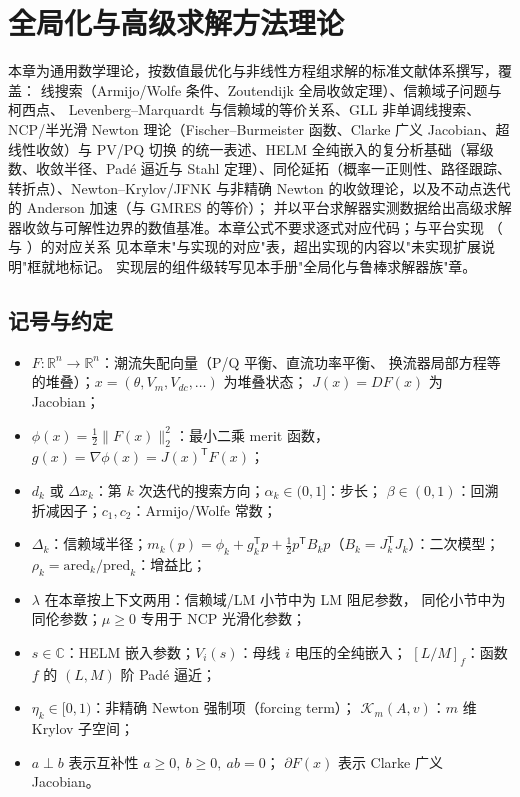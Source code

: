 
\section{全局化与高级求解方法理论}\label{sec:pf-th-glob}

\begin{theorynote}
本章为通用数学理论，按数值最优化与非线性方程组求解的标准文献体系撰写，覆盖：
线搜索（Armijo/Wolfe 条件、Zoutendijk 全局收敛定理）、信赖域子问题与柯西点、
Levenberg--Marquardt 与信赖域的等价关系、GLL 非单调线搜索、NCP/半光滑 Newton
理论（Fischer--Burmeister 函数、Clarke 广义 Jacobian、超线性收敛）与 PV/PQ 切换
的统一表述、HELM 全纯嵌入的复分析基础（幂级数、收敛半径、Padé 逼近与 Stahl
定理）、同伦延拓（概率一正则性、路径跟踪、转折点）、Newton--Krylov/JFNK
与非精确 Newton 的收敛理论，以及不动点迭代的 Anderson 加速（与 GMRES 的等价）；
并以平台求解器实测数据给出高级求解器收敛与可解性边界的数值基准。本章公式不要求逐式对应代码；与平台实现
（ 与 ）的对应关系
见本章末"与实现的对应"表，超出实现的内容以"未实现扩展说明"框就地标记。
实现层的组件级转写见本手册"全局化与鲁棒求解器族"章。
\end{theorynote}

\subsection{记号与约定}\label{sec:pf-th-glob-notation}
\begin{itemize}
  \item $F:\mathbb R^n\to\mathbb R^n$：潮流失配向量（P/Q 平衡、直流功率平衡、
        换流器局部方程等的堆叠）；$x=(\theta,V_m,V_{dc},\ldots)$ 为堆叠状态；
        $J(x)=DF(x)$ 为 Jacobian；
  \item $\phi(x)=\tfrac12\lVert F(x)\rVert_2^2$：最小二乘 merit 函数，
        $g(x)=\nabla\phi(x)=J(x)^{\mathsf T}F(x)$；
  \item $d_k$ 或 $\Delta x_k$：第 $k$ 次迭代的搜索方向；$\alpha_k\in(0,1]$：步长；
        $\beta\in(0,1)$：回溯折减因子；$c_1,c_2$：Armijo/Wolfe 常数；
  \item $\Delta_k$：信赖域半径；$m_k(p)=\phi_k+g_k^{\mathsf T}p+\tfrac12
        p^{\mathsf T}B_k p$（$B_k=J_k^{\mathsf T}J_k$）：二次模型；
        $\rho_k=\mathrm{ared}_k/\mathrm{pred}_k$：增益比；
  \item $\lambda$ 在本章按上下文两用：信赖域/LM 小节中为 LM 阻尼参数，
        同伦小节中为同伦参数；$\mu\ge0$ 专用于 NCP 光滑化参数；
  \item $s\in\mathbb C$：HELM 嵌入参数；$V_i(s)$：母线 $i$ 电压的全纯嵌入；
        $[L/M]_f$：函数 $f$ 的 $(L,M)$ 阶 Padé 逼近；
  \item $\eta_k\in[0,1)$：非精确 Newton 强制项（forcing term）；
        $\mathcal K_m(A,v)$：$m$ 维 Krylov 子空间；
  \item $a\perp b$ 表示互补性 $a\ge0,\ b\ge0,\ ab=0$；
        $\partial F(x)$ 表示 Clarke 广义 Jacobian。
\end{itemize}

